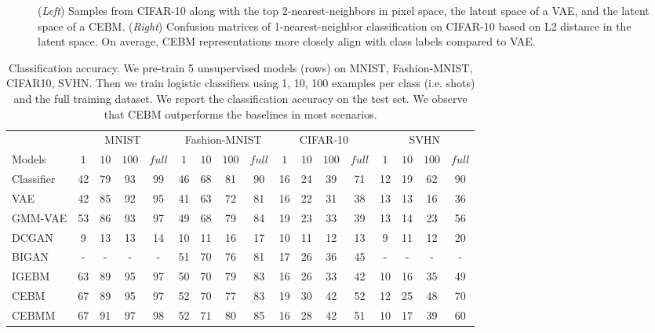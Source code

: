 \documentclass{article}
\begin{document}
\begin{figure}[!t]
\begin{subfigure}{0.45\textwidth}
\end{subfigure}
\caption{(\emph{Left}) Samples from CIFAR-10 along with the top 2-nearest-neighbors in pixel space, the latent space of a VAE, and the latent space of a CEBM. (\emph{Right}) Confusion matrices of 1-nearest-neighbor classification on CIFAR-10 based on L2 distance in the latent space. On average, CEBM representations more closely align with class labels compared to VAE.}
\label{fig:nearest-neighbours}
\end{figure}

\begin{table}[!t]
\caption{Classification accuracy. We pre-train 5 unsupervised models (rows) on MNIST, Fashion-MNIST, CIFAR10, SVHN. Then we train logistic classifiers using 1, 10, 100 examples per class (i.e. shots) and the full training dataset. We report the classification accuracy on the test set. We observe that CEBM outperforms the baselines in most scenarios.}
\centering
\begin{tabular}{l|cccc|cccc|cccc|cccc}
\toprule
 & \multicolumn{4}{c}{MNIST} & \multicolumn{4}{|c}{Fashion-MNIST} & \multicolumn{4}{|c}{CIFAR-10} & \multicolumn{4}{|c}{SVHN}\\
Models & $1$ & $10$  & $100$ & $full$ & $1$ & $10$  & $100$ & $full$ & $1$ & $10$  & $100$ & $full$ & $1$ & $10$  & $100$ & $full$ \\
\midrule
\midrule
Classifier & 42 & 79 & 93 & 99 & 46 & 68 & 81 & 90 & 16 & 24 & 39 & 71 & 12 & 19 & 62 & 90\\
\midrule
VAE & 42 & 85 & 92 & 95 & 41 & 63 & 72 & 81 & 16 & 22 & 31 & 38 & 13 & 13 & 16 & 36\\
GMM-VAE & 53 & 86 & 93 & 97 & 49 & 68 & 79 & 84 & 19 & 23 & 33 & 39 & 13 & 14 & 23 & 56  \\
DCGAN & 9 & 13 & 13 & 14 & 10 & 11 & 16 & 17 & 10 & 11 & 12 & 13 & 9 & 11 & 12 & 20 \\
BIGAN & - & - & - & - & 51 & 70 & 76 & 81 & 17 & 26 & 36 & 45 & - & - & - & -  \\ 
\midrule
IGEBM & 63 & 89 & 95 & 97 & 50 & 70 & 79 & 83 & 16 & 26 & 33 & 42 & 10 & 16 & 35 & 49\\
CEBM & 67 & 89 & 95 & 97 & 52 & 70 & 77 & 83 & 19 & 30 & 42 & 52 & 12 & 25 & 48 & 70 \\
CEBMM & 67 & 91 & 97 & 98 & 52 & 71 & 80 & 85 & 16 & 28 & 42 & 51 & 10 & 17 & 39 & 60 \\
\bottomrule
\end{tabular}
\label{tab:few-shot classification}
\end{table}
\end{document}
